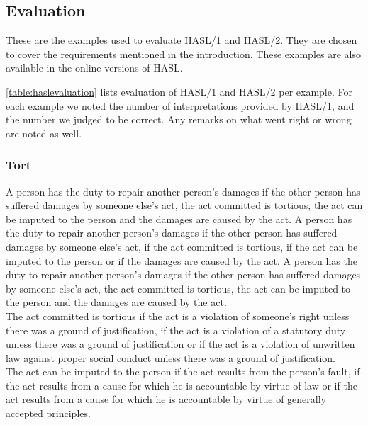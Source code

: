 \subsection{Evaluation}
\label{sec:appevaluation}
These are the examples used to evaluate HASL/1 and HASL/2. They are chosen to cover the requirements mentioned in the introduction. These examples are also available in the online versions of HASL.

\autoref{table:haslevaluation} lists evaluation of HASL/1 and HASL/2 per example. For each example we noted the number of interpretations provided by HASL/1, and the number we judged to be correct. Any remarks on what went right or wrong are noted as well.

\subsubsection{Tort}
\begin{exe}
\ex\label{e126} A person has the duty to repair another person's damages if the other person has suffered damages by someone else's act, the act committed is tortious, the act can be imputed to the person and the damages are caused by the act.
\ex\label{e127} A person has the duty to repair another person's damages if the other person has suffered damages by someone else's act, if the act committed is tortious, if the act can be imputed to the person or if the damages are caused by the act.
\ex\label{e128} A person has the duty to repair another person's damages if the other person has suffered damages by someone else's act, the act committed is tortious, the act can be imputed to the person and the damages are caused by the act.\\ The act committed is tortious if the act is a violation of someone’s right unless there was a ground of justification, if the act is a violation of a statutory duty unless there was a ground of justification or if the act is a violation of unwritten law against proper social conduct unless there was a ground of justification.\\ The act can be imputed to the person if the act results from the person's fault, if the act results from a cause for which he is accountable by virtue of law or if the act results from a cause for which he is accountable by virtue of generally accepted principles.
\end{exe}

\clearpage